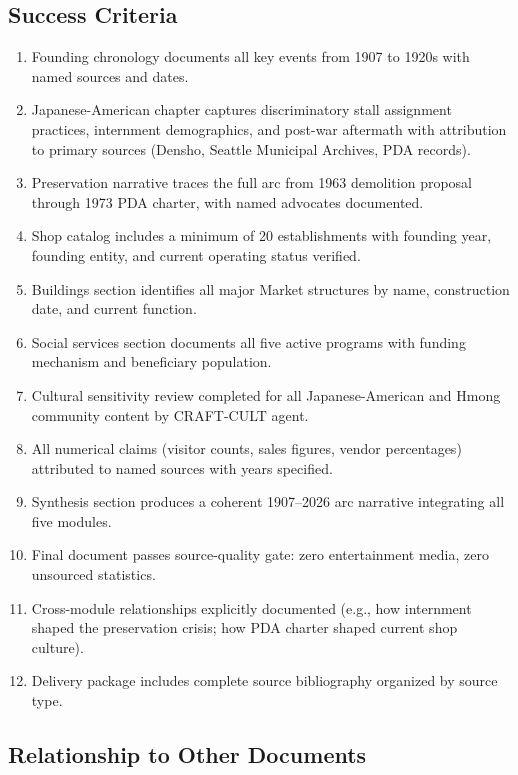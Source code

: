 \documentclass[11pt,letterpaper]{article}
\begin{document}
\subsection{Success Criteria}

\begin{enumerate}[leftmargin=*, label=\textbf{SC\arabic*.}]
  \item Founding chronology documents all key events from 1907 to 1920s with named sources and dates.
  \item Japanese-American chapter captures discriminatory stall assignment practices, internment demographics, and post-war aftermath with attribution to primary sources (Densho, Seattle Municipal Archives, PDA records).
  \item Preservation narrative traces the full arc from 1963 demolition proposal through 1973 PDA charter, with named advocates documented.
  \item Shop catalog includes a minimum of 20 establishments with founding year, founding entity, and current operating status verified.
  \item Buildings section identifies all major Market structures by name, construction date, and current function.
  \item Social services section documents all five active programs with funding mechanism and beneficiary population.
  \item Cultural sensitivity review completed for all Japanese-American and Hmong community content by CRAFT-CULT agent.
  \item All numerical claims (visitor counts, sales figures, vendor percentages) attributed to named sources with years specified.
  \item Synthesis section produces a coherent 1907--2026 arc narrative integrating all five modules.
  \item Final document passes source-quality gate: zero entertainment media, zero unsourced statistics.
  \item Cross-module relationships explicitly documented (e.g., how internment shaped the preservation crisis; how PDA charter shaped current shop culture).
  \item Delivery package includes complete source bibliography organized by source type.
\end{enumerate}

\subsection{Relationship to Other Documents}
\end{document}
